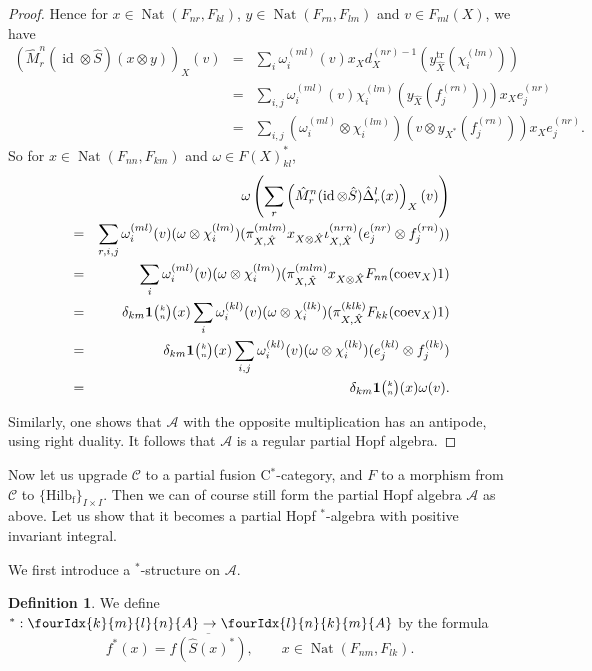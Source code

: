 \documentclass[10pt]{article}
\DeclareMathOperator{\fin}{\mathrm{f}}
\DeclareMathOperator{\id}{id}
\DeclareMathOperator{\Nat}{\mathrm{Nat}}
\DeclareMathOperator{\tr}{\mathrm{tr}}
\newcommand{\CatCC}{\mathscr{C}}
\newcommand{\Hilb}{\mathrm{Hilb}}
\newcommand{\coev}{\mathrm{coev}}
\newcommand{\Grt}[3]{#1{\tiny {\begin{pmatrix} #2\\#3\end{pmatrix}}}}
\newcommand{\UnitC}[2]{\Grt{\mathbf{1}}{#1}{#2}}
\newcommand{\Gr}[5]{\fourIdx{#2}{#4}{#3}{#5}{#1}}%
\theoremstyle{definition}
\newtheorem{Def}[Theorem]{Definition}
\numberwithin{equation}{section}
\begin{document}
\begin{proof}
Hence for $x\in \Nat(F_{nr},F_{kl})$, $y\in \Nat(F_{rn},F_{lm})$ and $v \in F_{ml}(X)$, we have \begin{eqnarray*} \left(\hat{M}^n_r(\id\otimes \hat{S})(x\otimes y)\right)_X(v) &=& \sum_i \omega_i^{(ml)}\left(v\right)  x_Xd_X^{(nr)-1}(y_{\hat{X}}^{\tr}(\chi_i^{(lm)}))\\ &=& \sum_{i,j} \omega_i^{(ml)}\left(v\right)  \chi_i^{(lm)}\left(y_{\hat{X}}(f_j^{(rn)}))\right)x_Xe_j^{(nr)} \\ &=& \sum_{i,j}(\omega_i^{(ml)}\otimes \chi_i^{(lm)})\left(v\otimes y_{X^*}(f_j^{(rn)})\right)x_Xe_j^{(nr)}.\end{eqnarray*} So for $ x\in \Nat(F_{nn},F_{km})$ and $\omega \in F(X)_{kl}^*$,  \begin{eqnarray*} && \hspace{-2cm} \omega\left(\sum_r\left(\hat{M}^n_r(\id\otimes \hat{S})\hat{\Delta}^l_r(x)\right)_X(v) \right) \\ &=& \sum_{r,i,j}
\omega_i^{(ml)}(v)(\omega\otimes \chi_i^{(lm)})(\pi_{X,\hat{X}}^{(mlm)}x_{X\otimes \hat{X}}\iota_{X,\hat{X}}^{(nrn)}(e_j^{(nr)}\otimes f_j^{(rn)})) \\
&=&  \sum_{i}
\omega_i^{(ml)}(v)(\omega\otimes \chi_i^{(lm)})(\pi_{X,\hat{X}}^{(mlm)}x_{X\otimes \hat{X}}F_{nn}(\coev_X)1)\\ &=&  \delta_{km} \UnitC{k}{n}(x)  \sum_{i}
\omega_i^{(kl)}(v)(\omega\otimes \chi_i^{(lk)})(\pi_{X,\hat{X}}^{(klk)}F_{kk}(\coev_X)1) \\ &=&  \delta_{km} \UnitC{k}{n}(x)  \sum_{i,j}
\omega_i^{(kl)}(v)(\omega\otimes \chi_i^{(lk)})(e_j^{(kl)}\otimes f_j^{(lk)}) \\ &=&  \delta_{km} \UnitC{k}{n}(x)  \omega(v).
\end{eqnarray*}

Similarly, one shows that $\mathscr{A}$ with the opposite multiplication has an antipode, using right duality. It follows that $\mathscr{A}$ is a regular partial Hopf algebra.  
\end{proof} 

Now let us upgrade $\CatCC$ to a partial fusion C$^*$-category, and $F$ to a morphism from $\CatCC$ to $\{\Hilb_{\fin}\}_{I\times I}$. Then we can of course still form the partial Hopf algebra $\mathscr{A}$ as above. Let us show that it becomes a partial Hopf $^*$-algebra with positive invariant integral.

We first introduce a $^*$-structure on $\mathscr{A}$. 

\begin{Def} We define $^*: \Gr{A}{k}{l}{m}{n}\rightarrow \Gr{A}{l}{k}{n}{m}$ by the formula \[f^*(x) = \overline{f(\hat{S}(x)^*)},\qquad x\in \Nat(F_{nm},F_{lk}).\]
\end{Def}
\end{document}
